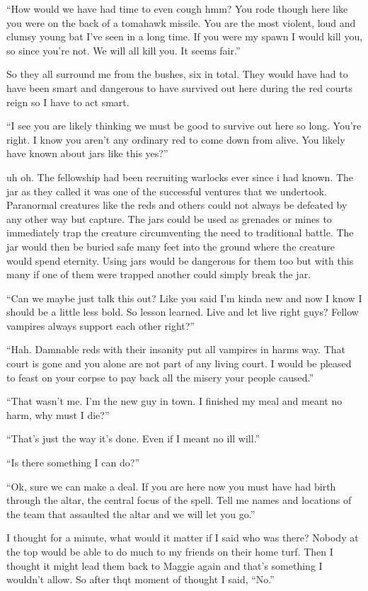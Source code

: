 ``How would we have had time to even cough hmm? You rode though here like you were on the back of a tomahawk missile. You are the most violent, loud and clumsy young bat I've seen in a long time. If you were my spawn I would kill you, so since you're not. We will all kill you. It seems fair.''

So they all surround me from the bushes, six in total. They would have had to have been smart and dangerous to have survived out here during the red courts reign so I have to act smart.

``I see you are likely thinking we must be good to survive out here so long. You're right. I know you aren't any ordinary red to come down from \chichenitza alive. You likely have known about jars like this yes?''

uh oh. The fellowship had been recruiting warlocks ever since i had known. The jar as they called it was one of the successful ventures that we undertook. Paranormal creatures like the reds and others could not always be defeated by any other way but capture. The jars could be used as grenades or mines to immediately trap the creature circumventing the need to traditional battle. The jar would then be buried safe many feet into the ground where the creature would spend eternity. Using jars would be dangerous for them too but with this many if one of them were trapped another could simply break the jar.

``Can we maybe just talk this out? Like you said I'm kinda new and now I know I should be a little less bold. So lesson learned. Live and let live right guys? Fellow vampires always support each other right?''

``Hah. Damnable reds with their insanity put all vampires in harms way. That court is gone and you alone are not part of any living court. I would be pleased to feast on your corpse to pay back all the misery your people caused.''

``That wasn't me. I'm the new guy in town. I finished my meal and meant no harm, why must I die?''

``That's just the way it's done. Even if I meant no ill will.''

``Is there something I can do?''

``Ok, sure we can make a deal. If you are here now you must have had birth through the altar, the central focus of the spell. Tell me names and locations of the team that assaulted the altar and we will let you go.''

I thought for a minute, what would it matter if I said who was there? Nobody at the top would be able to do much to my friends on their home turf. Then I thought it might lead them back to Maggie again and that's something I wouldn't allow. So after thqt moment of thought I said, ``No.''

